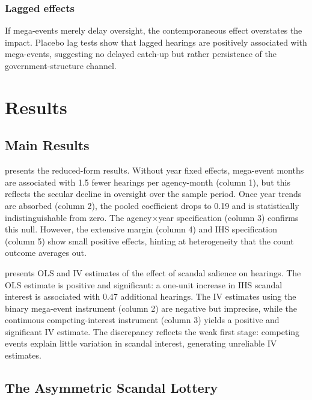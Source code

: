 \documentclass[12pt]{article}
\begin{document}
\subsubsection*{Lagged effects} If mega-events merely delay oversight, the contemporaneous effect overstates the impact. Placebo lag tests show that lagged hearings are positively associated with mega-events, suggesting no delayed catch-up but rather persistence of the government-structure channel.


\section{Results}
\label{sec:results}

\subsection{Main Results}



 presents the reduced-form results. Without year fixed effects, mega-event months are associated with 1.5 fewer hearings per agency-month (column 1), but this reflects the secular decline in oversight over the sample period. Once year trends are absorbed (column 2), the pooled coefficient drops to 0.19 and is statistically indistinguishable from zero. The agency$\times$year specification (column 3) confirms this null. However, the extensive margin (column 4) and IHS specification (column 5) show small positive effects, hinting at heterogeneity that the count outcome averages out.



 presents OLS and IV estimates of the effect of scandal salience on hearings. The OLS estimate is positive and significant: a one-unit increase in IHS scandal interest is associated with 0.47 additional hearings. The IV estimates using the binary mega-event instrument (column 2) are negative but imprecise, while the continuous competing-interest instrument (column 3) yields a positive and significant IV estimate. The discrepancy reflects the weak first stage: competing events explain little variation in scandal interest, generating unreliable IV estimates.

\subsection{The Asymmetric Scandal Lottery}
\end{document}
